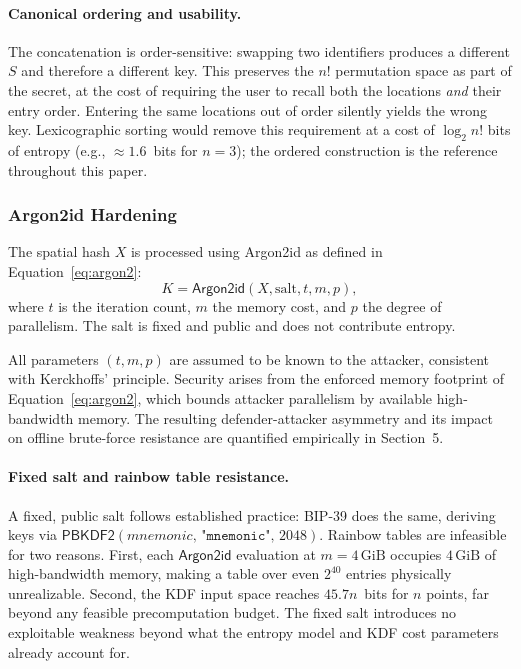 \documentclass[journal,article,submit,pdftex,moreauthors]{Definitions/mdpi}
\newcommand{\add}[1]{#1}
\newcommand{\add}[1]{\added{#1}}
\begin{document}
\paragraph{Canonical ordering and usability.} \add{The concatenation is order-sensitive: swapping two identifiers produces a different $S$ and therefore a different key. This preserves the $n!$ permutation space as part of the secret, at the cost of requiring the user to recall both the locations \emph{and} their entry order. Entering the same locations out of order silently yields the wrong key. Lexicographic sorting would remove this requirement at a cost of $\log_2 n!$ bits of entropy (e.g., $\approx 1.6$~bits for $n=3$); the ordered construction is the reference throughout this paper.}

\subsubsection{Argon2id Hardening}

The spatial hash $X$ is processed using Argon2id as defined in Equation~\ref{eq:argon2}:
\begin{equation}
K = \mathsf{Argon2id}(X, \text{salt}, t, m, p),
\label{eq:argon2}
\end{equation}
where $t$ is the iteration count, $m$ the memory cost, and $p$ the degree of parallelism. The salt is fixed and public and does not contribute entropy.

All parameters $(t,m,p)$ are assumed to be known to the attacker, consistent with Kerckhoffs’ principle. Security arises from the enforced memory footprint of Equation~\ref{eq:argon2}, which bounds attacker parallelism by available high-bandwidth memory. The resulting defender-attacker asymmetry and its impact on offline brute-force resistance are quantified empirically in Section~5.

\paragraph{\add{Fixed salt and rainbow table resistance.}} \add{A fixed, public salt follows established practice: BIP-39 does the same, deriving keys via $\mathsf{PBKDF2}(\textit{mnemonic},\,\texttt{"mnemonic"},\,2048)$. Rainbow tables are infeasible for two reasons. First, each $\mathsf{Argon2id}$ evaluation at $m=4\,\mathrm{GiB}$ occupies $4\,\mathrm{GiB}$ of high-bandwidth memory, making a table over even $2^{40}$ entries physically unrealizable. Second, the KDF input space reaches $45.7n$~bits for $n$ points, far beyond any feasible precomputation budget. The fixed salt introduces no exploitable weakness beyond what the entropy model and KDF cost parameters already account for.}
\end{document}
